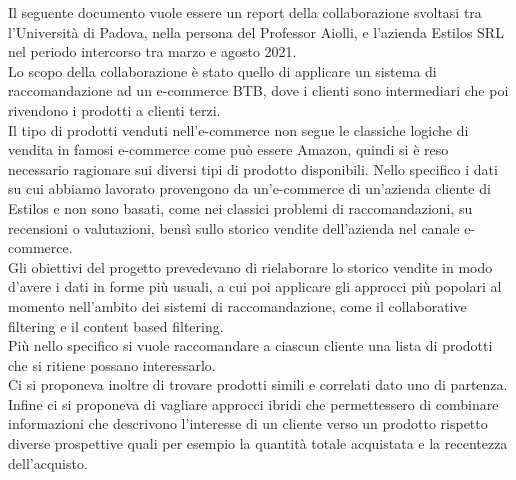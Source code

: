 
Il seguente documento vuole essere un report della collaborazione svoltasi tra l'Università di Padova, nella persona del Professor Aiolli, e l'azienda Estilos SRL nel periodo intercorso tra marzo e agosto 2021.\\
Lo scopo della collaborazione è stato quello di applicare un sistema di raccomandazione ad un e-commerce BTB, dove i clienti sono intermediari che poi rivendono i prodotti a clienti terzi.\\ Il tipo di prodotti venduti nell'e-commerce non segue le classiche logiche di vendita in famosi e-commerce come può essere Amazon, quindi si è reso necessario ragionare sui diversi tipi di prodotto disponibili.
Nello specifico i dati su cui abbiamo lavorato provengono da un'e-commerce di un'azienda cliente di Estilos e non sono basati, come nei classici problemi di raccomandazioni, su recensioni o valutazioni, bensì sullo storico vendite dell'azienda nel canale e-commerce.\\
Gli obiettivi del progetto prevedevano di rielaborare lo storico vendite in modo d'avere i dati in forme più usuali, a cui poi applicare gli approcci più popolari al momento nell'ambito dei sistemi di raccomandazione, come il collaborative filtering e il content based filtering. \\Più nello specifico si vuole raccomandare a ciascun cliente una lista di prodotti che si ritiene possano interessarlo.\\ Ci si proponeva inoltre di trovare prodotti simili e correlati dato uno di partenza. Infine ci si proponeva di vagliare approcci ibridi che permettessero di combinare informazioni che descrivono l'interesse di un cliente verso un prodotto rispetto diverse prospettive quali per esempio la quantità totale acquistata e la recentezza dell'acquisto.